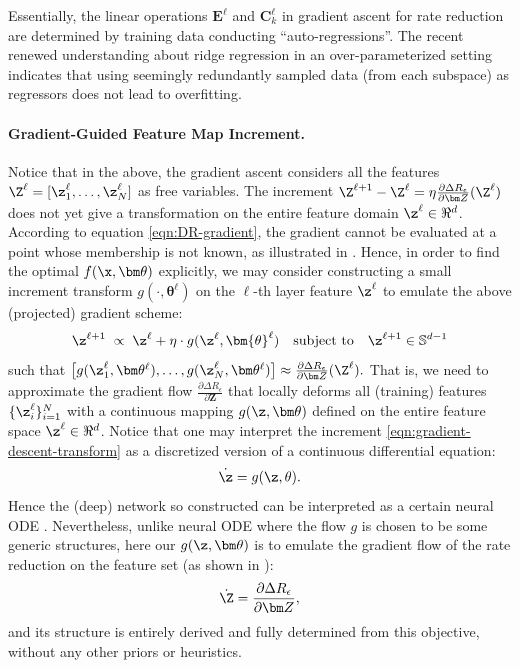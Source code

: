 \documentclass[../../book-main.tex]{subfiles}
\begin{document}
\begin{remark}
Essentially, the linear operations $\bm E^\ell$ and $\bm C_k^\ell$ in gradient ascent for rate reduction are determined by training data conducting ``auto-regressions''. The recent renewed understanding about ridge regression in an over-parameterized setting \cite{yang2020rethinking,Wu2020OnTO} indicates that using seemingly redundantly sampled data (from each subspace) as regressors does not lead to overfitting.
\end{remark}

\paragraph{Gradient-Guided Feature Map Increment.} Notice that in the above, the gradient ascent considers all the features $\Z^{\ell} = [\z^{\ell}_{1}, \dots, \z^{\ell}_{N}]$ as free variables. The increment $\Z^{\ell+1} - \Z^{\ell} = \eta \frac{\partial \Delta R_{\epsilon}}{\partial \bm Z}(\Z^\ell)$ does not yet give a transformation on the entire feature domain $\z^\ell \in \Re^d$. According to equation \eqref{eqn:DR-gradient}, the gradient cannot be evaluated at a point whose membership is not known, as illustrated in . Hence, in order to find the optimal $f(\x,\bm  \theta)$ explicitly, we may consider constructing a small increment transform $g(\cdot, \bm{\theta}^{\ell})$ on the $\ell$-th layer feature $\z^\ell$ to emulate the above (projected) gradient scheme:
\begin{equation}
\z^{\ell + 1}   \; \propto \; \z^{\ell} + \eta\cdot  g(\z^{\ell}, \bm{\theta}^{\ell}) \quad \mbox{subject to} \quad \z^{\ell +1} \in \mathbb{S}^{d-1}
\label{eqn:gradient-descent-transform}
\end{equation}
such that $\big[g(\z_1^{\ell}, \bm \theta^{\ell}), \ldots, g(\z_N^{\ell}, \bm \theta^{\ell}) \big] \approx \frac{\partial \Delta R_{\epsilon}}{\partial \bm Z}(\Z^\ell).$ That is, we need to approximate the gradient flow $\frac{\partial \Delta R_{\epsilon}}{\partial \bm Z}$ that locally deforms all (training) features $\{\z_i^\ell\}_{i=1}^N$ with a continuous mapping $g(\z,\bm \theta)$ defined on the entire feature space $\z^\ell \in \Re^d$.  
Notice that one may interpret the increment \eqref{eqn:gradient-descent-transform} as a discretized version of a continuous  differential equation:
\begin{equation}
\dot{\z} = g(\z, \theta).
\end{equation}
Hence the (deep) network so constructed can be interpreted as a certain neural ODE \cite{chen2018neural}. Nevertheless, unlike neural ODE where the flow $g$ is chosen to be some generic structures, here our $g(\z, \bm\theta)$ is to emulate the gradient flow of the rate reduction on the feature set (as shown in ): 
\begin{equation*}
    \dot{\Z} = \frac{\partial \Delta R_{\epsilon}}{\partial \bm Z},
\end{equation*} 
and its structure is entirely derived and fully determined from this objective, without any other priors or heuristics.  
\end{document}
